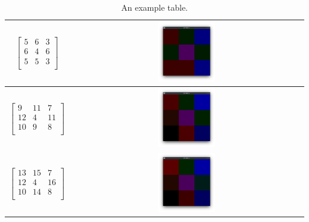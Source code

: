 \begin{table}
\begin{tabular}{|c|c|}
        \\
        \hline
        \begin{equation*}
            \begin{bmatrix}
                5 & 6 & 3 \\
                6 & 4 & 6 \\
                5 & 5 & 3 \\
            \end{bmatrix}
        \end{equation*}
        &
        \includegraphics[width=0.25\textwidth]{./latex/img/m2}
        \\
        \hline
        \begin{equation*}
            \begin{bmatrix}
                9  & 11 & 7  \\
                12 & 4  & 11 \\
                10 & 9  & 8  \\
            \end{bmatrix}
        \end{equation*}
        &
        \includegraphics[width=0.25\textwidth]{./latex/img/m3}
        \\
        \hline
        \begin{equation*}
            \begin{bmatrix}
                13 & 15 & 7  \\
                12 & 4  & 16 \\
                10 & 14 & 8  \\
            \end{bmatrix}
        \end{equation*}
        &
        \includegraphics[width=0.25\textwidth]{./latex/img/m4}
        \\
        \hline
    \end{tabular}
    \caption{\label{tab:widgets}An example table.}
\end{table}

